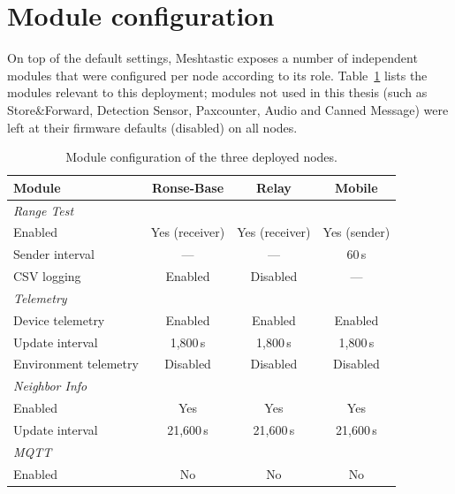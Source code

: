 \section{Module configuration}%
\label{sec:bijlage-config-modules}

On top of the default settings, Meshtastic exposes a number of independent modules
that were configured per node according to its role. Table~\ref{tab:bijlage-modules}
lists the modules relevant to this deployment; modules not used in this thesis
(such as Store\&Forward, Detection Sensor, Paxcounter, Audio and Canned Message)
were left at their firmware defaults (disabled) on all nodes.

\begin{table}[H]
  \centering
  \small
  \begin{tabular}{lccc}
    \toprule
    \textbf{Module} & \textbf{Ronse-Base} & \textbf{Relay} & \textbf{Mobile} \\
    \midrule
    \multicolumn{4}{l}{\textit{Range Test}} \\
    Enabled                 & Yes (receiver) & Yes (receiver) & Yes (sender) \\
    Sender interval         & ---          & ---         & 60\,s \\
    CSV logging             & Enabled      & Disabled    & --- \\
    \midrule
    \multicolumn{4}{l}{\textit{Telemetry}} \\
    Device telemetry        & Enabled      & Enabled     & Enabled \\
    Update interval         & 1,800\,s      & 1,800\,s     & 1,800\,s \\
    Environment telemetry   & Disabled     & Disabled    & Disabled \\
    \midrule
    \multicolumn{4}{l}{\textit{Neighbor Info}} \\
    Enabled                 & Yes          & Yes         & Yes \\
    Update interval         & 21,600\,s      & 21,600\,s     & 21,600\,s \\
    \midrule
    \multicolumn{4}{l}{\textit{MQTT}} \\
    Enabled                 & No           & No          & No \\
    \bottomrule
  \end{tabular}
  \caption[Module configuration]{\label{tab:bijlage-modules}Module configuration of the three deployed nodes.}
\end{table}

